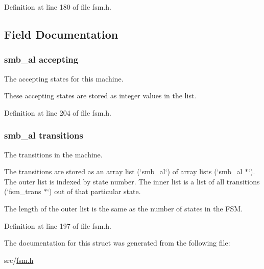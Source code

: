 \-Definition at line 180 of file fsm.\-h.



\subsection{\-Field \-Documentation}
\hypertarget{structfsm_a1b0a524350f2fa9bf19b3e3b35c20ff5}{
\subsubsection[{accepting}]{\setlength{\rightskip}{0pt plus 5cm}smb\-\_\-al {\bf accepting}}}\label{structfsm_a1b0a524350f2fa9bf19b3e3b35c20ff5}


\-The accepting states for this machine. 

\-These accepting states are stored as integer values in the list. 

\-Definition at line 204 of file fsm.\-h.

\hypertarget{structfsm_a22fef7588d41534fabaa8def82aabb2e}{
\subsubsection[{transitions}]{\setlength{\rightskip}{0pt plus 5cm}smb\-\_\-al {\bf transitions}}}\label{structfsm_a22fef7588d41534fabaa8def82aabb2e}


\-The transitions in the machine. 

\-The transitions are stored as an array list (`smb\-\_\-al`) of array lists (`smb\-\_\-al $\ast$`). \-The outer list is indexed by state number. \-The inner list is a list of all transitions (`fsm\-\_\-trans $\ast$`) out of that particular state.

\-The length of the outer list is the same as the number of states in the \-F\-S\-M. 

\-Definition at line 197 of file fsm.\-h.



\-The documentation for this struct was generated from the following file\-:\begin{DoxyCompactItemize}
\item 
src/\hyperlink{fsm_8h}{fsm.\-h}\end{DoxyCompactItemize}
